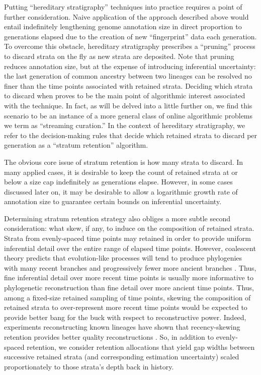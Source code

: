 Putting ``hereditary stratigraphy'' techniques into practice requires a point of further consideration.
Naive application of the approach described above would entail indefinitely lengthening genome annotation size in direct proportion to generations elapsed due to the creation of new ``fingerprint'' data each generation.
To overcome this obstacle, hereditary stratigraphy prescribes a ``pruning'' process to discard strata on the fly as new strata are deposited.
Note that pruning reduces annotation size, but at the expense of introducing inferential uncertainty: the last generation of common ancestry between two lineages can be resolved no finer than the time points associated with retained strata.
Deciding which strata to discard when proves to be the main point of algorithmic interest associated with the technique.
In fact, as will be delved into a little further on, we find this scenario to be an instance of a more general class of online algorithmic problems we term as ``streaming curation.''
In the context of hereditary stratigraphy, we refer to the decision-making rules that decide which retained strata to discard per generation as a ``stratum retention'' algorithm.

The obvious core issue of stratum retention is how many strata to discard.
In many applied cases, it is desirable to keep the count of retained strata at or below a size cap indefinitely as generations elapse.
However, in some cases discussed later on, it may be desirable to allow a logarithmic growth rate of annotation size to guarantee certain bounds on inferential uncertainty.

Determining stratum retention strategy also obliges a more subtle second consideration: what skew, if any, to induce on the composition of retained strata.
Strata from evenly-spaced time points may retained in order to provide uniform inferential detail over the entire range of elapsed time points.
However, coalescent theory predicts that evolution-like processes will tend to produce phylogenies with many recent branches and progressively fewer more ancient branches \citep{nordborgCoalescentTheory2019, berestyckiRecentProgressCoalescent2009}.
Thus, fine inferential detail over more recent time points is usually more informative to phylogenetic reconstruction than fine detail over more ancient time points.
Thus, among a fixed-size retained sampling of time points, skewing the composition of retained strata to over-represent more recent time points would be expected to provide better bang for the buck with respect to reconstructive power.
Indeed, experiments reconstructing known lineages have shown that recency-skewing retention provides better quality reconstructions \citep{moreno2022hereditary}.
So, in addition to evenly-spaced retention, we consider retention allocations that yield gap widths between successive retained strata (and corresponding estimation uncertainty) scaled proportionately to those strata's depth back in history.

